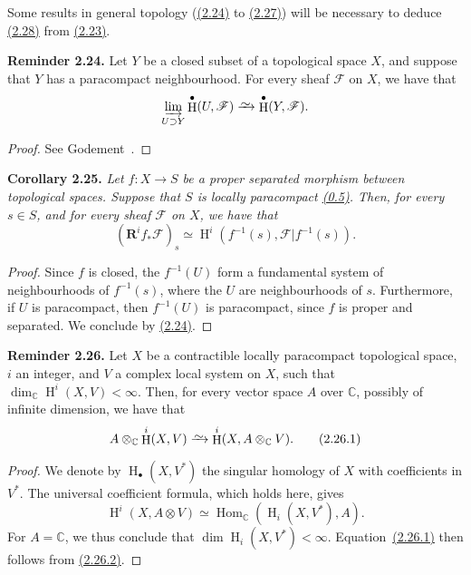 \documentclass{report}
\newenvironment{itenv}[1]
  {\phantomsection\par\medskip\noindent\textbf{#1.}\itshape}
  {\par\medskip}
\newenvironment{rmenv}[1]
  {\phantomsection\par\medskip\noindent\textbf{#1.}\rmfamily}
  {\par\medskip}
\newcommand{\scr}[1]{{\mathscr{#1}}}
\newcommand{\CC}{\mathbb{C}}
\newcommand{\RR}{\mathbf{R}}
\newcommand{\simto}{\xrightarrow{\raisebox{-0.7ex}[0ex][0ex]{$\sim$}}}
\DeclareMathOperator{\Hom}{Hom}
\DeclareMathOperator{\HH}{H}
\begin{document}
Some results in general topology (\hyperref[I.2.24]{(2.24)} to \hyperref[I.2.27]{(2.27)}) will be necessary to deduce \hyperref[I.2.28]{(2.28)} from \hyperref[I.2.23]{(2.23)}.

\begin{rmenv}{Reminder 2.24}
\label{I.2.24}
  Let $Y$ be a closed subset of a topological space $X$, and suppose that $Y$ has a paracompact neighbourhood.
  For every sheaf $\scr{F}$ on $X$, we have that
  \[
    \varinjlim_{U\supset Y} \HH^\bullet(U,\scr{F}) \simto \HH^\bullet(Y,\scr{F}).
  \]
\end{rmenv}

\begin{proof}
  See Godement~\cite[II, 4.11.1, p.~193]{7}.
\end{proof}

\begin{itenv}{Corollary 2.25}
\label{I.2.25}
  Let $f\colon X\to S$ be a proper separated morphism between topological spaces.
  Suppose that $S$ is locally paracompact \hyperref[0.5]{(0.5)}.
  Then, for every $s\in S$, and for every sheaf $\scr{F}$ on $X$, we have that
  \[
    (\RR^i f_*\scr{F})_s \simeq \HH^i(f^{-1}(s), \scr{F}|f^{-1}(s)).
  \]
\end{itenv}

\begin{proof}
  Since $f$ is closed, the $f^{-1}(U)$ form a fundamental system of neighbourhoods of $f^{-1}(s)$, where the $U$ are neighbourhoods of $s$.
  Furthermore, if $U$ is paracompact, then $f^{-1}(U)$ is paracompact, since $f$ is proper and separated.
  We conclude by \hyperref[I.2.24]{(2.24)}.
\end{proof}

\begin{rmenv}{Reminder 2.26}
\label{I.2.26}
  Let $X$ be a contractible locally paracompact topological space, $i$ an integer, and $V$ a complex local system on $X$, such that $\dim_\CC\HH^i(X,V)<\infty$.
  Then, for every vector space $A$ over $\CC$, possibly of infinite dimension, we have that
  \[
  \label{I.2.26.1}
    A\otimes_\CC\HH^i(X,V) \simto \HH^i(X,A\otimes_\CC V).
  \tag{2.26.1}
  \]
\end{rmenv}

\begin{proof}
  We denote by $\HH_\bullet(X,V^*)$ the singular homology of $X$ with coefficients in $V^*$.
  The universal coefficient formula, which holds here, gives
  \[
  \label{I.2.26.2}
    \HH^i(X,A\otimes V) \simeq \Hom_\CC(\HH_i(X,V^*),A).
  \tag{2.26.2}
  \]
  For $A=\CC$, we thus conclude that $\dim\HH_i(X,V^*)<\infty$.
  Equation~\hyperref[I.2.26.1]{(2.26.1)} then follows from \hyperref[I.2.26.2]{(2.26.2)}.
\end{proof}
\end{document}
